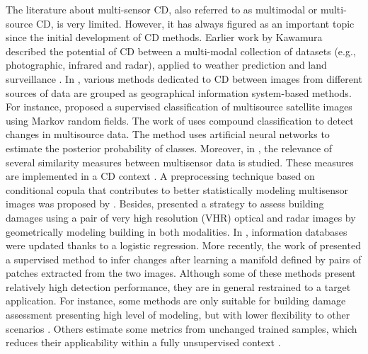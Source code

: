 \documentclass[review]{elsarticle}
\begin{document}
The literature about multi-sensor CD, also referred to as multimodal or multi-source CD, is very limited. However,  it has always figured as an important topic since the initial development of CD methods.  Earlier work by Kawamura described the potential of CD between a multi-modal collection of datasets (e.g., photographic, infrared and radar), applied to weather prediction and land surveillance \citep{kawamura_automatic_1971}. In \citet{lu_change_2004}, various methods dedicated to CD between images from different sources of data are grouped as geographical information system-based methods. For instance, \citet{solberg_markov_1996} proposed a supervised classification of multisource satellite images using Markov random fields. The work of \citet{bruzzone_neural-statistical_1999} uses compound classification to detect changes in multisource data. The method uses artificial neural networks to estimate the posterior probability of classes. Moreover, in \citet{inglada_similarity_2002}, the relevance of several similarity measures between multisensor data is studied. These measures are implemented in a CD context \citep{alberga_comparison_2007}. A preprocessing technique based on conditional copula that contributes to better statistically modeling multisensor images was proposed by \citet{mercier_conditional_2008}. Besides, \citet{brunner_earthquake_2010} presented a strategy to assess building damages using a pair of very high resolution (VHR) optical and radar images by geometrically modeling building in both modalities. In \citet{chabert_logistic_2010}, information databases were updated thanks to a logistic regression. More recently, the work of \citet{prendes_new_2015} presented a supervised method to infer changes after learning a manifold defined by pairs of patches extracted from the two images. Although some of these methods present relatively high detection performance, they are in general restrained to a target application. For instance, some methods are only suitable for building damage assessment presenting high level of modeling, but with lower flexibility to other scenarios \citep{brunner_earthquake_2010,chabert_logistic_2010}. Others estimate some metrics from unchanged trained samples, which reduces their applicability within a fully unsupervised context \citep{bruzzone_neural-statistical_1999,prendes_new_2015,mercier_conditional_2008}.
\end{document}
